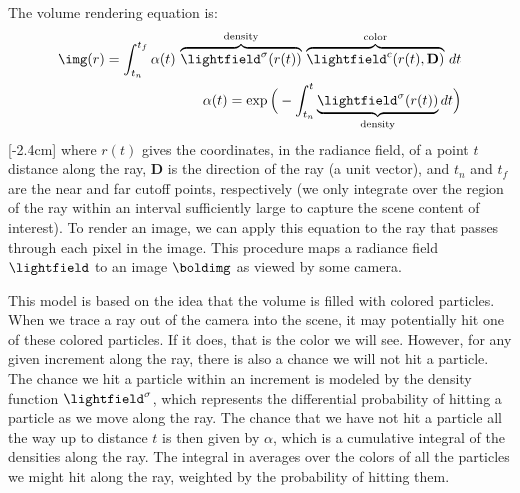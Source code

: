 The volume rendering equation is:
\begin{align}
    \img(r) = \int_{t_n}^{t_f}\alpha(t) \, \overbrace{\lightfield^\sigma(r(t))}^{\text{density}} \, \overbrace{\lightfield^c(r(t),\mathbf{D})}^{\text{color}} \, dt \label{eqn:nerfs:vol_rendering_integral}\\
    \alpha(t) = \exp \Big(-\int_{t_n}^{t} \underbrace{\lightfield^\sigma(r(t))}_{\text{density}} dt\Big)
\end{align}
[-2.4cm]
where $r(t)$ gives the coordinates, in the radiance field, of a point $t$ distance along the ray, $\mathbf{D}$ is the direction of the ray (a unit vector), and $t_n$ and $t_f$ are the near and far cutoff points, respectively (we only integrate over the region of the ray within an interval sufficiently large to capture the scene content of interest). To render an image, we can apply this equation to the ray that passes through each pixel in the image. This procedure maps a radiance field $\lightfield$ to an image $\boldimg$ as viewed by some camera.

This model is based on the idea that the volume is filled with colored particles. When we trace a ray out of the camera into the scene, it may potentially hit one of these colored particles. 
If it does, that is the color we will see. However, for any given increment along the ray, there is also a chance we will not hit a particle. The chance we hit a particle within an 
increment is modeled by the density function $\lightfield^\sigma$, which represents the differential probability of hitting a particle as we move along the ray. 
The chance that we have not hit a particle all the way up to distance $t$ is then given by $\alpha$, which is a cumulative integral of the densities along the ray. 
The integral in \eqn{\ref{eqn:nerfs:vol_rendering_integral}} averages over the colors of all the particles we might hit along the ray, 
weighted by the probability of hitting them.


